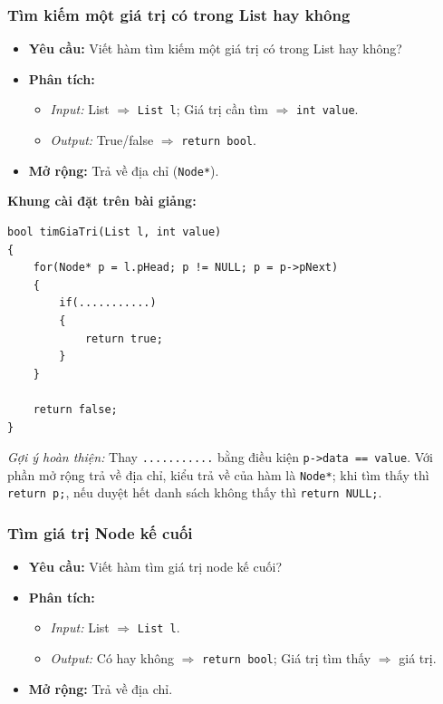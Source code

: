 \documentclass[12pt,a4paper]{article}
\begin{document}
\subsubsection{Tìm kiếm một giá trị có trong List hay không}
\begin{itemize}[itemsep=0.15em]
    \item \textbf{Yêu cầu:} Viết hàm tìm kiếm một giá trị có trong List hay không?
    \item \textbf{Phân tích:}
    \begin{itemize}
        \item \textit{Input:} List $\Rightarrow$ \texttt{List l}; Giá trị cần tìm $\Rightarrow$ \texttt{int value}.
        \item \textit{Output:} True/false $\Rightarrow$ \texttt{return bool}.
    \end{itemize}
    \item \textbf{Mở rộng:} Trả về địa chỉ (\texttt{Node*}).
\end{itemize}
\textbf{Khung cài đặt trên bài giảng:}
\begin{lstlisting}
bool timGiaTri(List l, int value)
{
    for(Node* p = l.pHead; p != NULL; p = p->pNext)
    {
        if(...........)
        {
            return true;
        }
    }

    return false;
}
\end{lstlisting}
\noindent\textit{Gợi ý hoàn thiện:} Thay \texttt{...........} bằng điều kiện \texttt{p->data == value}. Với phần mở rộng trả về địa chỉ, kiểu trả về của hàm là \texttt{Node*}; khi tìm thấy thì \texttt{return p;}, nếu duyệt hết danh sách không thấy thì \texttt{return NULL;}.

\subsubsection{Tìm giá trị Node kế cuối}
\begin{itemize}[itemsep=0.15em]
    \item \textbf{Yêu cầu:} Viết hàm tìm giá trị node kế cuối?
    \item \textbf{Phân tích:}
    \begin{itemize}
        \item \textit{Input:} List $\Rightarrow$ \texttt{List l}.
        \item \textit{Output:} Có hay không $\Rightarrow$ \texttt{return bool}; Giá trị tìm thấy $\Rightarrow$ giá trị.
    \end{itemize}
    \item \textbf{Mở rộng:} Trả về địa chỉ.
\end{itemize}
\end{document}
